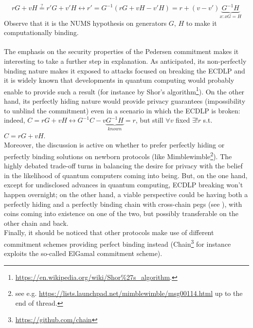 \begin{equation*}
    rG + vH \overset{?}{=}r'G + v'H \leftrightarrow r' = G^{-1}(rG + vH - v'H) = r + (v - v')\underbrace{G^{-1}H}_{x: xG = H}
\end{equation*}
Observe that it is the NUMS hypothesis on generators $G$, $H$ to make it computationally binding.\\ \ \\
The emphasis on the security properties of the Pedersen commitment makes it interesting to take a further step in explanation. As anticipated, its non-perfectly binding nature makes it exposed to attacks focused on breaking the ECDLP and it is widely known that developments in quantum computing would probably enable to provide such a result (for instance by Shor's algorithm\footnote{\url{https://en.wikipedia.org/wiki/Shor\%27s_algorithm}.}). On the other hand, its perfectly hiding nature would provide privacy guarantees (impossibility to unblind the commitment) even in a scenario in which the ECDLP is broken: indeed, $C = rG + vH \leftrightarrow G^{-1}C - v\underbrace{G^{-1}H}_{known} = r$, but still $\forall v$ fixed $\exists! r$ s.t. $C = rG + vH$.\\
Moreover, the discussion is active on whether to prefer perfectly hiding or perfectly binding solutions on newborn protocols (like Mimblewimble\footnote{see e.g. \url{https://lists.launchpad.net/mimblewimble/msg00114.html} up to the end of thread.}). The highly debated trade-off turns in balancing the desire for privacy with the belief in the likelihood of quantum computers coming into being. But, on the one hand, except for undisclosed advances in quantum computing, ECDLP breaking won't happen overnight; on the other hand, a viable perspective could be having both a perfectly hiding and a perfectly binding chain with cross-chain pegs (see \cite{Sidechain}), with coins coming into existence on one of the two, but possibly transferable on the other chain and back.\\
Finally, it should be noticed that other protocols make use of different commitment schemes providing perfect binding instead (Chain\footnote{\url{https://github.com/chain}} for instance exploits the so-called ElGamal commitment scheme).

